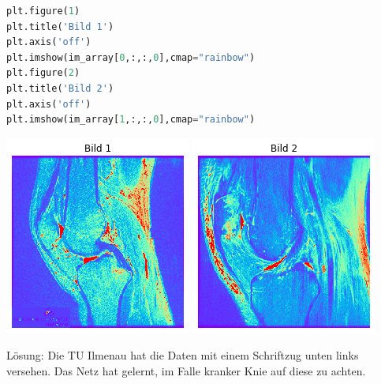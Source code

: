 \documentclass[a4paper,10pt,titlepage]{scrartcl}
\begin{document}
\begin{lstlisting}[language=python]
plt.figure(1)
plt.title('Bild 1')
plt.axis('off')
plt.imshow(im_array[0,:,:,0],cmap="rainbow")
plt.figure(2)
plt.title('Bild 2')
plt.axis('off')
plt.imshow(im_array[1,:,:,0],cmap="rainbow")
\end{lstlisting}
\begin{center}
    \includegraphics[width=.2\linewidth]{Assets/prakBMT-DeepLearning-14.png}
    \includegraphics[width=.2\linewidth]{Assets/prakBMT-DeepLearning-15.png}
\end{center}

Lösung: Die TU Ilmenau hat die Daten mit einem Schriftzug unten links versehen. Das Netz hat gelernt, im Falle kranker Knie auf diese zu achten.
\end{document}
